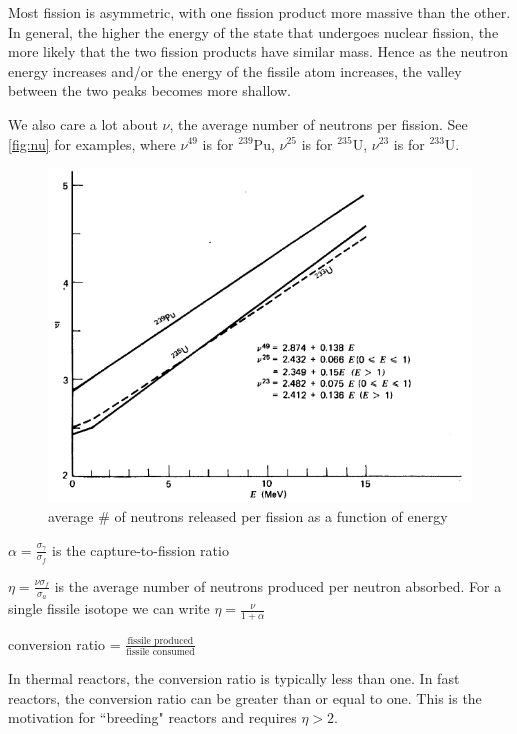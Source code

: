 \documentclass[12pt]{article}
\begin{document}
Most fission is asymmetric, with one fission product more massive than the other. In general, the higher the energy of the state that undergoes nuclear fission, the more likely that the two fission products have similar mass. Hence as the neutron energy increases and/or the energy of the fissile atom increases, the valley between the two peaks becomes more shallow.

We also care a lot about
$\nu$, the average number of neutrons per fission. See \autoref{fig:nu} for examples, where $\nu^{49}$ is for $^{239}$Pu, $\nu^{25}$ is for $^{235}$U, $\nu^{23}$ is for $^{233}$U.
\begin{figure}
\begin{center}
\includegraphics[scale=0.6]{../figs/nu}
\caption{average \# of neutrons released per fission as a function of energy}
\label{fig:nu}
\end{center}
\end{figure}


$\alpha = \frac{\sigma_\gamma}{\sigma_f}$ is the capture-to-fission ratio

$\eta = \frac{\nu \sigma_f}{\sigma_a}$ is the average number of neutrons produced per neutron absorbed. For a single fissile isotope we can write $\eta = \frac{\nu}{1+\alpha}$

conversion ratio = $\frac{\text{fissile produced}}{\text{fissile consumed}}$

In thermal reactors, the conversion ratio is typically less than one. In fast reactors, the conversion ratio can be greater than or equal to one. This is the motivation for ``breeding" reactors and requires $\eta >2$.
\end{document}
